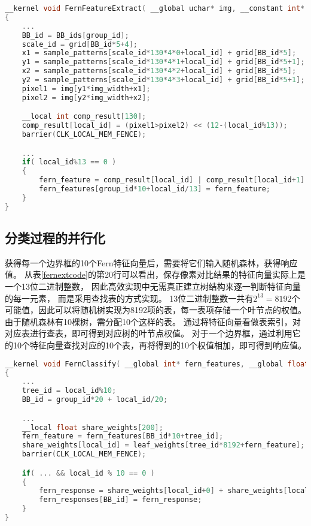 \begin{table}
\caption{特征提取的Kernel程序}
\label{fernextcode}
\begin{lstlisting}[language=C++, basicstyle=\ttfamily\footnotesize]
__kernel void FernFeatureExtract( __global uchar* img, __constant int* grid, __global int* BB_ids, __constant uchar* sample_patterns, __global int* fern_features,  ... )
{
	...
	BB_id = BB_ids[group_id];
	scale_id = grid[BB_id*5+4];
	x1 = sample_patterns[scale_id*130*4*0+local_id] + grid[BB_id*5]; 
	y1 = sample_patterns[scale_id*130*4*1+local_id] + grid[BB_id*5+1]; 
	x2 = sample_patterns[scale_id*130*4*2+local_id] + grid[BB_id*5]; 
	y2 = sample_patterns[scale_id*130*4*3+local_id] + grid[BB_id*5+1]; 
	pixel1 = img[y1*img_width+x1];
	pixel2 = img[y2*img_width+x2];

	__local int comp_result[130];
	comp_result[local_id] = (pixel1>pixel2) << (12-(local_id%13));
	barrier(CLK_LOCAL_MEM_FENCE);

	...
	if( local_id%13 == 0 )
	{
		fern_feature = comp_result[local_id] | comp_result[local_id+1] | ... | comp_result[local_id+12];
		fern_features[group_id*10+local_id/13] = fern_feature;
	}
}
\end{lstlisting}
\end{table}

\subsection{分类过程的并行化}
\label{fernclassifysec}
获得每一个边界框的10个Fern特征向量后，需要将它们输入随机森林，获得响应值。
从表\ref{fernextcode}的第20行可以看出，保存像素对比结果的特征向量实际上是一个13位二进制整数，
因此高效实现中无需真正建立树结构来逐一判断特征向量的每一元素，
而是采用查找表的方式实现。
13位二进制整数一共有$2^{13}=8192$个可能值，因此可以将随机树实现为8192项的表，每一表项存储一个叶节点的权值。
由于随机森林有10棵树，需分配10个这样的表。
通过将特征向量看做表索引，对对应表进行查表，即可得到对应树的叶节点权值。
对于一个边界框，通过利用它的10个特征向量查找对应的10个表，再将得到的10个权值相加，即可得到响应值。

\begin{table}
\caption{分类过程的Kernel程序}
\label{fernclassifycode}
\begin{lstlisting}[language=C++, basicstyle=\ttfamily\footnotesize]
__kernel void FernClassify( __global int* fern_features, __global float* leaf_weights, __global float* fern_responses, ... )
{
	...
	tree_id = local_id%10;
	BB_id = group_id*20 + local_id/20;

	...
	__local float share_weights[200];	
	fern_feature = fern_features[BB_id*10+tree_id];
	share_weights[local_id] = leaf_weights[tree_id*8192+fern_feature];
	barrier(CLK_LOCAL_MEM_FENCE);

	if( ... && local_id % 10 == 0 )
	{
		fern_response = share_weights[local_id+0] + share_weights[local_id+1] + ... + share_weights[local_id+9];
		fern_responses[BB_id] = fern_response;
	}
}
\end{lstlisting}
\end{table}

